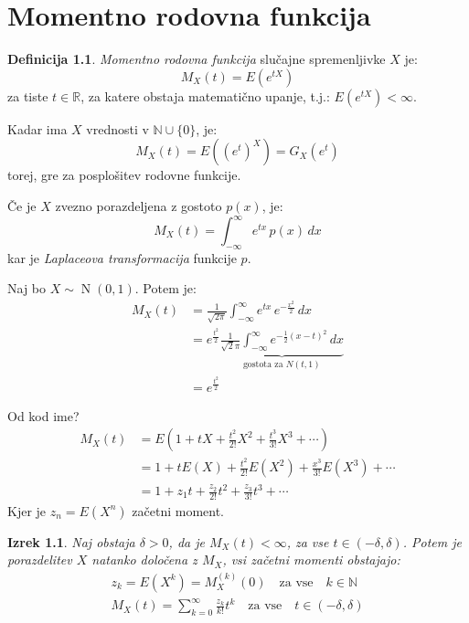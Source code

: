 \documentclass[12pt]{book}
\def\n{\noindent}
\theoremstyle{definition}
\newtheorem{definicija}{Definicija}
\theoremstyle{plain}
\newtheorem{izrek}{Izrek}
\theoremstyle{plain}
\theoremstyle{plain}
\theoremstyle{remark}
\begin{document}
\chapter{Momentno rodovna funkcija}

\begin{definicija}
    \emph{Momentno rodovna funkcija} slučajne spremenljivke $X$ je: 
    $$
    M_X(t)=E\left(e^{t  X}\right)
    $$
    za tiste $t \in \mathbb{R}$, za katere obstaja matematično upanje, t.j.: $E\left(e^{t X}\right)<\infty$.    
\end{definicija}

\n Kadar ima $X$ vrednosti v $\mathbb{N} \cup \{0\}$, je: 
$$
M_X(t)=E\left(\left(e^t\right)^X\right)=G_X\left(e^t\right)
$$
torej, gre za posplošitev rodovne funkcije. 

\n Če je $X$ zvezno porazdeljena z gostoto $p(x)$, je: 
$$
M_X(t)=\int_{-\infty}^{\infty} e^{t  x} \, p(x) \, d x
$$
kar je \emph{Laplaceova transformacija} funkcije $p$. 

\begin{zgled}
    Naj bo $X \sim \operatorname{N}(0,1)$. Potem je:
    $$
    \begin{aligned}
        M_X(t)&=\frac{1}{\sqrt{2 \pi}} \int_{-\infty}^{\infty} e^{t x} \, e^{-\frac{x^2}{2}} \,d x \\
        &=e^{\frac{t^2}{2}} \underbrace{\frac{1}{\sqrt{2} \pi} \int_{-\infty}^{\infty} e^{-\frac{1}{2}(x-t)^2} \, d x}_{\text {gostota za } N(t, 1)} \\
        &=e^{\frac{t^2}{2}}
    \end{aligned}
    $$
\end{zgled}

\n Od kod ime?
$$
\begin{aligned}
    M_X(t) & =E\left(1+t X+\frac{t^2}{2!} X^2+\frac{t^3}{3!} X^3+\cdots\right) \\
    & =1+t E(X)+\frac{t^2}{2!} E\left(X^2\right)+\frac{x^3}{3!} E\left(X^3\right) + \cdots \\
    & =1+z_1 t+\frac{z_2}{2!} t^2+\frac{z_3}{3!} t^3+\cdots
\end{aligned}
$$
Kjer je $z_n=E\left(X^n\right)$ začetni moment. 

\begin{izrek}
    Naj obstaja $\delta > 0$, da je $M_X(t)<\infty$, za vse $t \in(-\delta, \delta)$. Potem je porazdelitev $X$ natanko določena z $M_X$, vsi začetni momenti obstajajo: 
    $$
    \begin{aligned}
        & z_k=E\left(X^k\right)=M_X^{(k)}(0) \quad \text {za vse} \quad  k \in \mathbb{N} & \\
        & M_X(t)=\sum_{k=0}^{\infty} \frac{z_k}{k !} t^k \quad \text{za vse} \quad {t \in(-\delta, \delta)} &
    \end{aligned}
    $$
\end{izrek}
\end{document}
